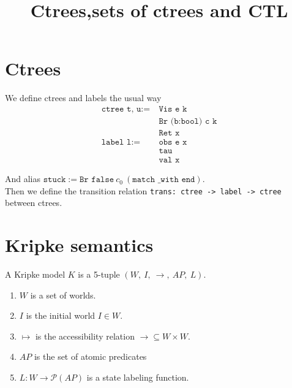 \documentclass[10pt]{acmart}
\title{Ctrees,sets of ctrees and CTL}
\begin{document}
\section*{Ctrees}

We define ctrees and labels the usual way
\begin{align*}
  \texttt{ctree\ t, u} := &\ \texttt{Vis e k} \\
           &\ \texttt{Br (b:bool) c k} \\
           &\ \texttt{Ret x} \\
  \texttt{label \ l} := &\ \texttt{obs e x} \\
           &\ \texttt{tau} \\
           &\ \texttt{val x}
\end{align*}

And alias $\texttt{stuck} := \texttt{Br false}\ c_0\ (\texttt{match \_ with end})$.\\

Then we define the transition relation \texttt{trans: ctree -> label -> ctree} between ctrees.\\

\begin{minipage}{0.4\textwidth}
\vspace*{1cm}
\end{minipage}
\hspace{2cm}
\begin{minipage}{0.4\textwidth}

\vspace*{1cm}

\end{minipage}
\vspace{1cm}

\section*{Kripke semantics}
A Kripke model $K$ is a 5-tuple $(W,\ I,\ \to,\ AP,\ L)$.
\begin{enumerate}
\item $W$ is a set of worlds.
\item $I$ is the initial world $I \in W$.
\item $\mapsto$ is the accessibility relation $\to \subseteq W \times W$.
\item $AP$ is the set of atomic predicates
\item $L: W \to \mathcal{P}(AP)$ is a state labeling function.
\end{enumerate}
\end{document}
